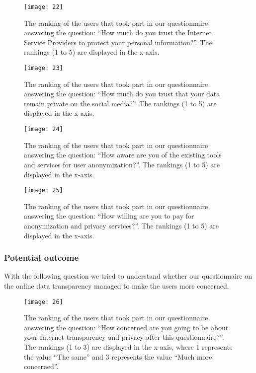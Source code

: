 \begin{figure}[H]
\centering
\texttt{[image: 22]}
\caption{The ranking of the users that took part in our questionnaire answering
the question: ``How much do you trust the Internet Service Providers to protect 
your personal information?''. The rankings (1 to 5) are displayed in the x-axis.}
\end{figure}

\begin{figure}[H]
\centering
\texttt{[image: 23]}
\caption{The ranking of the users that took part in our questionnaire answering
the question: ``How much do you trust that your data remain private on the 
social media?''. The rankings (1 to 5) are displayed in the x-axis.}
\end{figure}

\begin{figure}[H]
\centering
\texttt{[image: 24]}
\caption{The ranking of the users that took part in our questionnaire answering
the question: ``How aware are you of the existing tools and services for user 
anonymization?''. The rankings (1 to 5) are displayed in the x-axis.}
\end{figure}

\begin{figure}[H]
\centering
\texttt{[image: 25]}
\caption{The ranking of the users that took part in our questionnaire answering
the question: ``How willing are you to pay for anonymization and privacy 
services?''. The rankings (1 to 5) are displayed in the x-axis.}
\end{figure}

\subsubsection{Potential outcome}

With the following question we tried to understand whether our questionnaire on 
the online data transparency managed to make the users more concerned.  

\begin{figure}[H]
\centering
\texttt{[image: 26]}
\caption{The ranking of the users that took part in our questionnaire answering
the question: ``How concerned are you going to be about your Internet 
transparency and privacy after this questionnaire?''. The
rankings (1 to 3) are displayed in the x-axis, where 1 represents the value 
``The same'' and 3 represents the value ``Much more concerned''.}
\end{figure}

